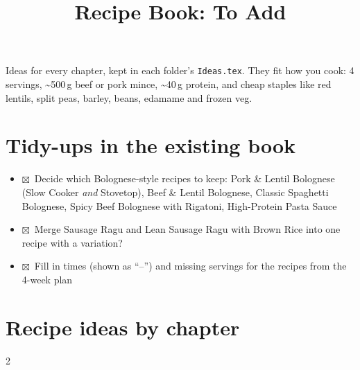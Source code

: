 \documentclass[11pt,a4paper]{article}
\title{Recipe Book: To Add}
\date{}
\newcommand{\done}{$\boxtimes$\ }
\begin{document}
\maketitle
\vspace{-2em}

Ideas for every chapter, kept in each folder's \texttt{Ideas.tex}. They fit how you cook:
4 servings, \textasciitilde500\,g beef or pork mince, \textasciitilde40\,g protein, and cheap staples
like red lentils, split peas, barley, beans, edamame and frozen veg.

\section*{Tidy-ups in the existing book}
\begin{itemize}
  \item \done Decide which Bolognese-style recipes to keep: Pork \& Lentil Bolognese (Slow Cooker
        \emph{and} Stovetop), Beef \& Lentil Bolognese, Classic Spaghetti Bolognese, Spicy Beef
        Bolognese with Rigatoni, High-Protein Pasta Sauce
  \item \done Merge Sausage Ragu and Lean Sausage Ragu with Brown Rice into one recipe with a variation?
  \item \done Fill in times (shown as ``--'') and missing servings for the recipes from the 4-week plan
\end{itemize}

\section*{Recipe ideas by chapter}
\begin{multicols}{2}
\raggedcolumns










\end{multicols}
\end{document}
